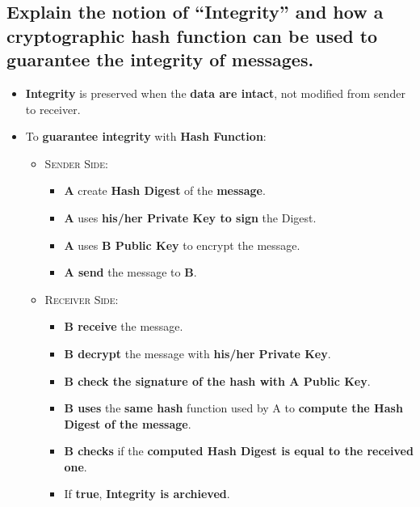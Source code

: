 \documentclass[9pt, letterpaper]{article}
\begin{document}
\subsection{Explain the notion of “Integrity” and how a cryptographic hash function can be used to guarantee the integrity of messages.}
\begin{itemize}
	\item \textbf{Integrity} is preserved when the \textbf{data are intact}, not modified from sender to receiver.
	\item To \textbf{guarantee integrity} with \textbf{Hash Function}:
	      \begin{itemize}
		      \item \textsc{Sender Side}:
		            \begin{itemize}
			            \item \textbf{A} create \textbf{Hash Digest} of the \textbf{message}.
			            \item \textbf{A} uses \textbf{his/her Private Key to sign} the Digest.
			            \item \textbf{A} uses \textbf{B Public Key} to encrypt the message.
			            \item \textbf{A send} the message to \textbf{B}.
		            \end{itemize}
		      \item \textsc{Receiver Side}:
		            \begin{itemize}
			            \item \textbf{B receive} the message.
			            \item \textbf{B decrypt} the message with \textbf{his/her Private Key}.
			            \item \textbf{B check the signature of the hash with A Public Key}.
			            \item \textbf{B uses} the \textbf{same hash} function used by A to \textbf{compute the Hash Digest of the message}.
			            \item \textbf{B checks} if the \textbf{computed Hash Digest is equal to the received one}.
			            \item If \textbf{true}, \textbf{Integrity is archieved}.
		            \end{itemize}
	      \end{itemize}
\end{itemize}
\end{document}
